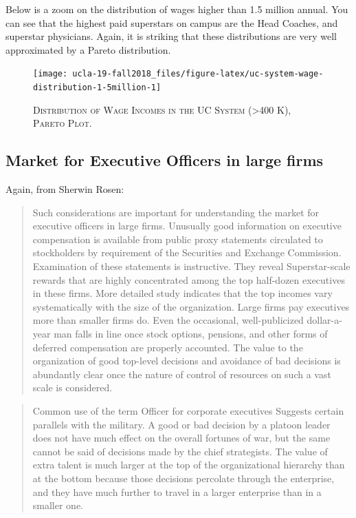 \documentclass[]{book}
\theoremstyle{definition}
\theoremstyle{definition}
\theoremstyle{definition}
\theoremstyle{remark}
\begin{document}
Below is a zoom on the distribution of wages higher than 1.5 million
annual. You can see that the highest paid superstars on campus are the
Head Coaches, and superstar physicians. Again, it is striking that these
distributions are very well approximated by a Pareto distribution.




\begin{figure}

{\centering \texttt{[image: ucla-19-fall2018\_files/figure-latex/uc-system-wage-distribution-1-5million-1]} 

}

\caption{\textsc{Distribution of
Wage Incomes in the UC System (\textgreater{}400 K), Pareto Plot.}}\label{fig:uc-system-wage-distribution-1-5million}
\end{figure}

\subsection{Market for Executive Officers in large
firms}\label{market-for-executive-officers-in-large-firms}

Again, from Sherwin Rosen:

\begin{quote}
Such considerations are important for understanding the market for
executive officers in large firms. Unusually good information on
executive compensation is available from public proxy statements
circulated to stockholders by requirement of the Securities and Exchange
Commission. Examination of these statements is instructive. They reveal
Superstar-scale rewards that are highly concentrated among the top
half-dozen executives in these firms. More detailed study indicates that
the top incomes vary systematically with the size of the organization.
Large firms pay executives more than smaller firms do. Even the
occasional, well-publicized dollar-a-year man falls in line once stock
options, pensions, and other forms of deferred compensation are properly
accounted. The value to the organization of good top-level decisions and
avoidance of bad decisions is abundantly clear once the nature of
control of resources on such a vast scale is considered.
\end{quote}

\begin{quote}
Common use of the term Officer for corporate executives Suggests certain
parallels with the military. A good or bad decision by a platoon leader
does not have much effect on the overall fortunes of war, but the same
cannot be said of decisions made by the chief strategists. The value of
extra talent is much larger at the top of the organizational hierarchy
than at the bottom because those decisions percolate through the
enterprise, and they have much further to travel in a larger enterprise
than in a smaller one.
\end{quote}
\end{document}
